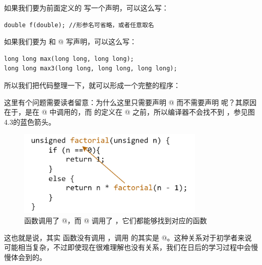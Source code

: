 如果我们要为前面定义的 \lstinline@f@ 写一个声明，可以这么写：
\begin{lstlisting}
double f(double); //形参名可省略，或者任意取名
\end{lstlisting}
如果我们要为 \lstinline@max@ 和 @ 写声明，可以这么写：
\begin{lstlisting}
long long max(long long, long long); 
long long max3(long long, long long, long long);
\end{lstlisting}\par
所以我们把代码整理一下，就可以形成一个完整的程序：
\par
这里有个问题需要读者留意：为什么这里只需要声明 @ 而不需要声明 \lstinline@max@ 呢？其原因在于，\lstinline@max@ 是在 @ 中调用的，而 \lstinline@max@ 的定义在 @ 之前，所以编译器不会找不到 \lstinline@max@，参见图4.3的蓝色箭头。\par
\begin{figure}[htbp]
    \centering
    \includegraphics[width=0.8\textwidth]{../images/generalized_parts/04_max3_code_logic.png}
    \caption{\lstinline@main@ 函数调用了 @，而 @ 调用了 \lstinline@max@，它们都能够找到对应的函数}
\end{figure}
这也就是说，其实 \lstinline@main@ 函数没有调用 \lstinline@max@，调用 \lstinline@max@ 的其实是 @。这种关系对于初学者来说可能相当复杂，不过即使现在很难理解也没有关系，我们在日后的学习过程中会慢慢体会到的。\par
